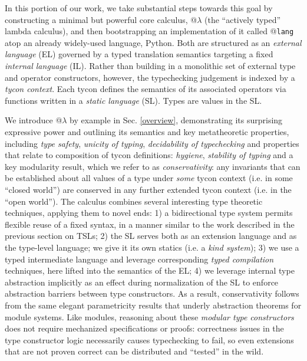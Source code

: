 In this portion of our work, we take substantial steps towards this goal by  constructing a minimal but powerful core calculus, @$\lambda$ (the ``actively typed'' lambda calculus), and then bootstrapping an implementation of it called @\texttt{lang} atop an already widely-used language, Python. %
Both are structured as an \emph{external language} (EL) governed by a {typed translation semantics} targeting a fixed \emph{internal language} (IL). 
Rather than building in a monolithic set of external type and operator constructors, however, the typechecking judgement is indexed by a \emph{tycon context}. Each tycon defines the semantics of its associated operators via functions written in a \emph{static language} (SL). Types are values in the SL.%

We introduce @$\lambda$ by example in Sec. \ref{overview}, demonstrating its surprising expressive power and outlining its semantics and key metatheoretic properties, including \emph{type safety}, \emph{unicity of typing},  \emph{decidability of typechecking} and properties that relate to composition of tycon definitions: \emph{hygiene}, \emph{stability of typing} and a key modularity result, which we refer to as  \emph{conservativity}: any invariants that can be established about all values of a type under \emph{some} tycon context (i.e. in some  ``closed world'') are conserved in any further extended tycon context (i.e. in the ``open world''). The calculus combines several interesting type theoretic techniques, applying them to novel ends: 1)  a bidirectional type system permits flexible reuse of a fixed syntax, in a manner similar to the work described in the previous section on TSLs; 2) the SL serves both as an extension language and as the type-level language; we give it its own statics (i.e. a \emph{kind system}); 3) we use a typed intermediate language and leverage corresponding \emph{typed compilation} techniques, here lifted into the semantics of the EL; 4) we leverage internal type abstraction implicitly as an effect during normalization of the SL to enforce abstraction barriers between type constructors. 
As a result, conservativity follows from the same elegant parametricity results that underly  abstraction theorems for module systems. 
Like modules, reasoning about these \emph{modular type constructors} does not require  mechanized specifications or proofs: correctness issues in the type constructor logic necessarily causes typechecking to fail, so even extensions that are not proven correct can be distributed and ``tested'' in the wild.

